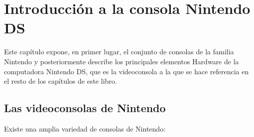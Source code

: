 \chapter{Introducción a la consola Nintendo DS}

Este capítulo expone, en primer lugar, el conjunto de consolas de la familia Nintendo y posteriormente describe los principales elementos Hardware de la computadora Nintendo DS, que es la videoconsola a la que se hace referencia en el resto de los capítulos de este libro.

\section{Las videoconsolas de Nintendo}

Existe una amplia variedad de consolas de Nintendo:

